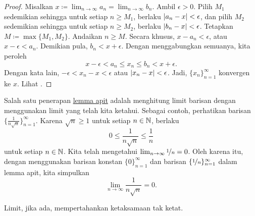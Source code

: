 \begin{proof}
Misalkan $x \coloneqq \lim_{n\to\infty} a_n = \lim_{n\to\infty} b_n$.
Ambil $\epsilon > 0$.
Pilih $M_1$ sedemikian sehingga untuk setiap $n \geq M_1$, berlaku
$\lvert {a_n-x} \rvert < \epsilon$, dan pilih $M_2$
sedemikian sehingga untuk setiap $n \geq M_2$,
berlaku $\lvert {b_n-x} \rvert < \epsilon$.  Tetapkan $M \coloneqq \max \{M_1, M_2 \}$.
Andaikan $n \geq M$.
Secara khusus,
$x - a_n < \epsilon$, atau 
$x - \epsilon < a_n$.  Demikian pula, $b_n < x + \epsilon$.
Dengan menggabungkan semuanya, kita peroleh
\begin{equation*}
x - \epsilon < a_n \leq x_n \leq b_n < x + \epsilon .
\end{equation*}
Dengan kata lain, $-\epsilon < x_n-x < \epsilon$ atau $\lvert {x_n-x} \rvert < \epsilon$.
Jadi, $\{x_n\}_{n=1}^\infty$ konvergen ke $x$.
Lihat .
\end{proof}

\begin{myfigureht}
\caption{Bukti lemma apit dalam gambar.\label{figsqueeze}}
\end{myfigureht}

\begin{example}
Salah satu penerapan
\hyperref[squeeze:lemma]{lemma apit} adalah menghitung limit 
barisan dengan menggunakan limit yang telah kita ketahui.  Sebagai contoh, perhatikan
barisan $\bigl\{ \frac{1}{n\sqrt{n}} \bigr\}_{n=1}^\infty$.
Karena $\sqrt{n} \geq 1$ untuk setiap $n \in {\mathbb{N}}$, berlaku
\begin{equation*}
0 \leq \frac{1}{n\sqrt{n}} \leq \frac{1}{n}
\end{equation*}
untuk setiap $n \in {\mathbb{N}}$.  Kita telah mengetahui $\lim_{n\to\infty} \nicefrac{1}{n} = 0$. 
Oleh karena itu, dengan menggunakan
barisan konstan $\{ 0 \}_{n=1}^\infty$ dan barisan
$\{ \nicefrac{1}{n} \}_{n=1}^\infty$ dalam
lemma apit, kita simpulkan
\begin{equation*}
\lim_{n\to\infty} \frac{1}{n\sqrt{n}} = 0 .
\end{equation*}
\end{example}

Limit, jika ada, mempertahankan ketaksamaan tak ketat.

